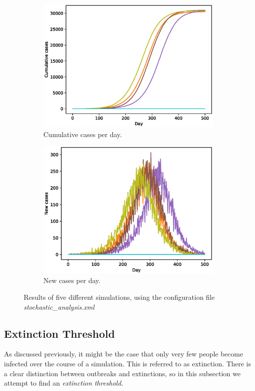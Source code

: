 \documentclass[runningheads]{llncs}
\begin{document}
\begin{figure}[h!]
	\centering
	\begin{subfigure}[b]{0.7\linewidth}
		\includegraphics[width=\linewidth]{cases_cum.eps}
		\caption{Cumulative cases per day.}
	\end{subfigure}
	\begin{subfigure}[b]{0.7\linewidth}
		\includegraphics[width=\linewidth]{cases_per_day.eps}
		\caption{New cases per day.}
	\end{subfigure}
	\caption{Results of five different simulations, using the configuration file \emph{stochastic\_analysis.xml}}
	\label{casesPlots}
\end{figure}


\subsection{Extinction Threshold}
As discussed previously, it might be the case that only very few people become infected over the course of a simulation. This is referred to as extinction. There is a clear distinction between outbreaks and extinctions, so in this subsection we attempt to find an \emph{extinction threshold}.
\end{document}
